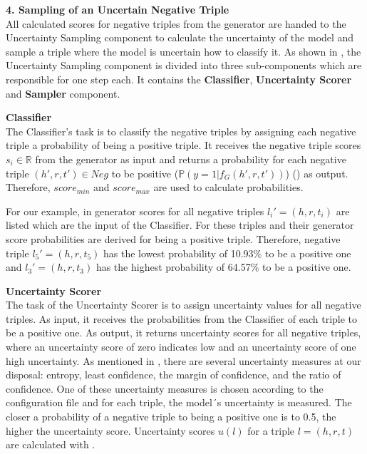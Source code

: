 \textbf{4. Sampling of an Uncertain Negative Triple}\\
%
All calculated scores for negative triples from the generator are handed to the Uncertainty Sampling component to calculate the uncertainty of the model and sample a triple where the model is uncertain how to classify it.
As shown in , the Uncertainty Sampling component is divided into three sub-components which are responsible for one step each.
It contains the \textbf{Classifier}, \textbf{Uncertainty Scorer} and \textbf{Sampler} component.

\clearpage

\textbf{Classifier} \\
The Classifier's task is to classify the negative triples by assigning each negative triple a probability of being a positive triple.
It receives the negative triple scores $s_i \in \mathbb{R}$ from the generator as input and returns a probability for each negative triple $(h',r,t') \in Neg$ to be positive  ($\mathbb{P}(y = 1| f_G(h',r,t'))$) () as output. 
Therefore, $score_{min}$ and $score_{max}$ are used to calculate probabilities.


For our example, in  generator scores for all negative triples $l_i' = (h, r, t_i)$ are listed which are the input of the Classifier.
For these triples and their generator score probabilities are derived for being a positive triple.
Therefore, negative triple $l_5' = (h,r,t_5)$ has the lowest probability of 10.93\% to be a positive one and $l_3' = (h,r,t_3)$ has the highest probability of 64.57\% to be a positive one.

\textbf{Uncertainty Scorer} \\
The task of the Uncertainty Scorer is to assign uncertainty values for all negative triples.
As input, it receives the probabilities from the Classifier of each triple to be a positive one.
As output, it returns uncertainty scores for all negative triples, where an uncertainty score of zero indicates low and an uncertainty score of one high uncertainty.
As mentioned in , there are several uncertainty measures at our disposal:
entropy, least confidence, the margin of confidence, and the ratio of confidence.
One of these uncertainty measures is chosen according to the configuration file and for each triple, the model´s uncertainty is measured.
The closer a probability of a negative triple to being a positive one is to 0.5, the higher the uncertainty score. 
Uncertainty scores $u(l)$ for a triple $l = (h,r,t)$ are calculated with .
\clearpage

